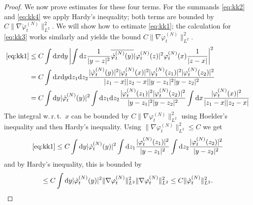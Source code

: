 \documentclass[11pt,a4paper,draft,DIV11]{scrartcl}	%
\newcommand{\di}{\textrm{d}}		%
\newcommand{\cc}[1]{\overline{#1}}	%
\newcommand{\norm}[1]{\lVert#1\rVert}	%
\newcommand{\ph}{\varphi_t^{(N)}}	%
\newcommand{\phdot}{\dot{\varphi}_t^{(N)}}	%
\newcommand{\bd}{\begin{displaymath}}			%
\newcommand{\ed}{\end{displaymath}}
\begin{document}
\begin{proof}
We now prove estimates for these four terms. For the summands \eqref{eq:kk2} and \eqref{eq:kk4} we apply Hardy's inequality; both terms are bounded by $C \norm{\nabla \phdot}_{L^2}^2$.
We will show how to estimate \eqref{eq:kk1}; the calculation for \eqref{eq:kk3} works similarly and yields the bound $C \norm{\nabla \phdot}_{L^2}^2$.
\begin{align*}
\eqref{eq:kk1} & \leq C \int \di x \di y \left\lvert \int \di z \frac{1}{\lvert y-z\rvert^2} \cc{\phdot(y)} \lvert \ph(z)\rvert^2 {\ph(x)} \frac{1}{\lvert z-x\rvert} \right\rvert^2 \\
& = C \int \di x \di y \di z_1 \di z_2 \frac{\lvert\phdot(y)\rvert^2 \lvert \ph(x)\rvert^2 \lvert \ph(z_1)\rvert^2 \lvert \ph(z_2)\rvert^2}{\lvert z_1-x\rvert \lvert z_2 -x\rvert \lvert y-z_1\rvert^2 \lvert y-z_2\rvert^2} \\
& = C \int \di y \lvert\phdot(y)\rvert^2 \int \di z_1 \di z_2 \frac{\lvert \ph(z_1)\rvert^2 \lvert \ph(z_2)\rvert^2}{\lvert y-z_1\rvert^2 \lvert y-z_2\rvert^2} \int \di x \frac{\lvert \ph(x)\rvert^2}{\lvert z_1-x\rvert \lvert z_2 - x\rvert}
\end{align*}
The integral w.\,r.\,t.\ $x$ can be bounded by $C \norm{\nabla \ph}_{L^2}^2$ using Hoelder's inequality and then Hardy's inequality. Using $\norm{\nabla \ph}_{L^2}^2 \leq C$ we get
\bd
\eqref{eq:kk1} \leq C \int \di y \lvert\phdot(y)\rvert^2 \int \di z_1 \frac{\lvert \ph(z_1)\rvert^2 }{\lvert y-z_1\rvert^2 } \int \di z_2 \frac{\lvert \ph(z_2)\rvert^2}{\lvert y-z_2\rvert^2}
\ed
and by Hardy's inequality, this is bounded by
\bd
\leq C \int \di y \lvert \phdot(y)\rvert^2 \norm{\nabla \ph}_{L^2}^2 \norm{\nabla \ph}_{L^2}^2 \leq C \norm{\phdot}_{L^2}^2. \qedhere
\ed
\end{proof}




\end{document}
